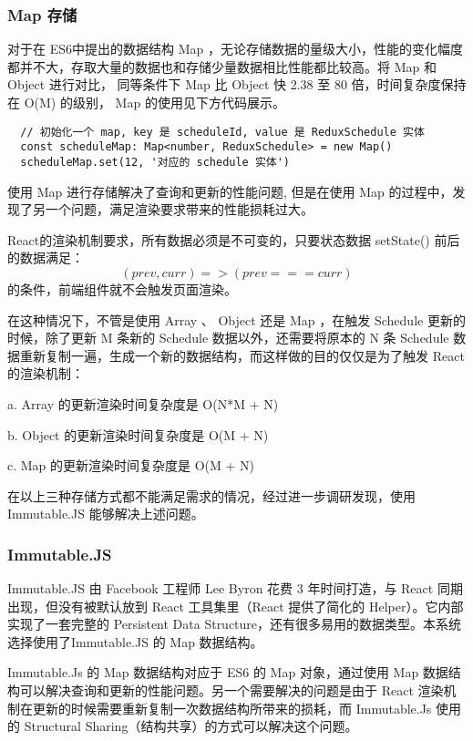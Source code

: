 \subsubsection{Map 存储}

对于在 ES6中提出的数据结构 Map ，无论存储数据的量级大小，性能的变化幅度都并不大，存取大量的数据也和存储少量数据相比性能都比较高。将 Map 和 Object 进行对比， 同等条件下 Map 比 Object 快 2.38 至 80 倍，时间复杂度保持在 O(M) 的级别， Map 的使用见下方代码展示。

{\setmainfont{Courier New Bold}
\begin{lstlisting}
  // 初始化一个 map, key 是 scheduleId, value 是 ReduxSchedule 实体
  const scheduleMap: Map<number, ReduxSchedule> = new Map()
  scheduleMap.set(12, '对应的 schedule 实体')
 \end{lstlisting}}

  使用 Map 进行存储解决了查询和更新的性能问题, 但是在使用 Map 的过程中，发现了另一个问题，满足渲染要求带来的性能损耗过大。

  React的渲染机制要求，所有数据必须是不可变的，只要状态数据 setState() 前后的数据满足：
  \begin{equation}
    (prev, curr) => (prev === curr)
  \end{equation}
  的条件，前端组件就不会触发页面渲染。

  在这种情况下，不管是使用 Array 、 Object 还是 Map ，在触发 Schedule 更新的时候，除了更新 M 条新的 Schedule 数据以外，还需要将原本的 N 条 Schedule 数据重新复制一遍，生成一个新的数据结构，而这样做的目的仅仅是为了触发 React 的渲染机制：

  \quad{}a. Array 的更新渲染时间复杂度是 O(N*M + N)


  \quad{}b. Object 的更新渲染时间复杂度是 O(M + N)


  \quad{}c. Map 的更新渲染时间复杂度是 O(M + N)

  在以上三种存储方式都不能满足需求的情况，经过进一步调研发现，使用 Immutable.JS 能够解决上述问题。

  \subsubsection{Immutable.JS}
  Immutable.JS 由 Facebook 工程师 Lee Byron 花费 3 年时间打造，与 React 同期出现，但没有被默认放到 React 工具集里（React 提供了简化的 Helper）。它内部实现了一套完整的 Persistent Data Structure，还有很多易用的数据类型。本系统选择使用了Immutable.JS 的 Map 数据结构。

  Immutable.Js 的 Map 数据结构对应于 ES6 的 Map 对象，通过使用 Map 数据结构可以解决查询和更新的性能问题。另一个需要解决的问题是由于 React 渲染机制在更新的时候需要重新复制一次数据结构所带来的损耗，而 Immutable.Js 使用的 Structural Sharing（结构共享）的方式可以解决这个问题。

